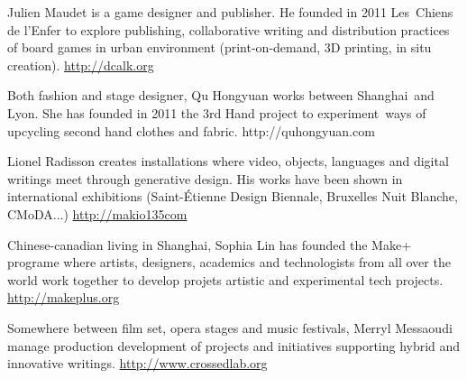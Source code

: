 \newline
{}Julien Maudet is a game designer and publisher. He founded in 2011
Les~Chiens de l{\textquoteright}Enfer to explore publishing,
collaborative writing and distribution practices of board games in
urban environment (print-on-demand, 3D printing, in situ
creation).\newline
\href{http://dcalk.org/}{http://dcalk.org}

Both fashion and stage designer, Qu Hongyuan works between Shanghai~and
Lyon. She has founded in 2011 the 3rd Hand project to experiment~ways
of upcycling second hand clothes and fabric.\newline
http://quhongyuan.com

\newline
Lionel Radisson creates installations where video, objects, languages
and digital writings meet through generative design. His works have
been shown in international exhibitions (Saint-\'Etienne Design
Biennale, Bruxelles Nuit Blanche, CMoDA...)
\href{http://makio135com/}{http://makio135com}


\bigskip

\newline
Chinese-canadian living in Shanghai, Sophia Lin has founded the Make+
programe where artists, designers, academics and technologists from all
over the world work together to develop projets artistic and
experimental tech projects.~\newline
\href{http://makeplus.org/}{http://makeplus.org}

\newline
Somewhere between film set, opera stages and music festivals, Merryl
Messaoudi manage production development of projects and initiatives
supporting hybrid and innovative writings. \newline
\href{http://www.crossedlab.org/}{http://www.crossedlab.org}
\endinput
